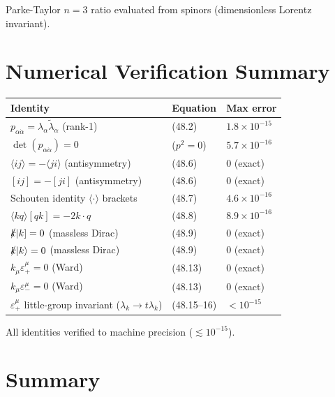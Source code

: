 \documentclass[12pt]{article}
\newcommand{\verified}[1]{\textcolor{verifygreen}{\checkmark\; #1}}
\begin{document}
\verified{Parke-Taylor $n=3$ ratio evaluated from spinors (dimensionless Lorentz invariant).}

\section{Numerical Verification Summary}

\begin{center}
\renewcommand{\arraystretch}{1.5}
\begin{tabular}{@{}lll@{}}
  \toprule
  Identity & Equation & Max error \\
  \midrule
  $p_{\alpha\dot\alpha} = \lambda_\alpha\tilde\lambda_{\dot\alpha}$ (rank-1)
    & (48.2) & $1.8\times10^{-15}$ \\
  $\det(p_{\alpha\dot\alpha}) = 0$
    & ($p^2=0$) & $5.7\times10^{-16}$ \\
  $\langle ij\rangle = -\langle ji\rangle$ (antisymmetry)
    & (48.6) & $0$ (exact) \\
  $[ij] = -[ji]$ (antisymmetry)
    & (48.6) & $0$ (exact) \\
  Schouten identity $\langle\cdot\rangle$ brackets
    & (48.7) & $4.6\times10^{-16}$ \\
  $\langle kq\rangle[qk] = -2k\cdot q$
    & (48.8) & $8.9\times10^{-16}$ \\
  $\slashed{k}|k] = 0$ (massless Dirac)
    & (48.9) & $0$ (exact) \\
  $\slashed{k}|k\rangle = 0$ (massless Dirac)
    & (48.9) & $0$ (exact) \\
  $k_\mu\varepsilon_+^\mu = 0$ (Ward)
    & (48.13) & $0$ (exact) \\
  $k_\mu\varepsilon_-^\mu = 0$ (Ward)
    & (48.13) & $0$ (exact) \\
  $\varepsilon_+^\mu$ little-group invariant ($\lambda_k\to t\lambda_k$)
    & (48.15--16) & $< 10^{-15}$ \\
  \bottomrule
\end{tabular}
\end{center}

All identities verified to machine precision ($\lesssim 10^{-15}$).

\section{Summary}
\end{document}
